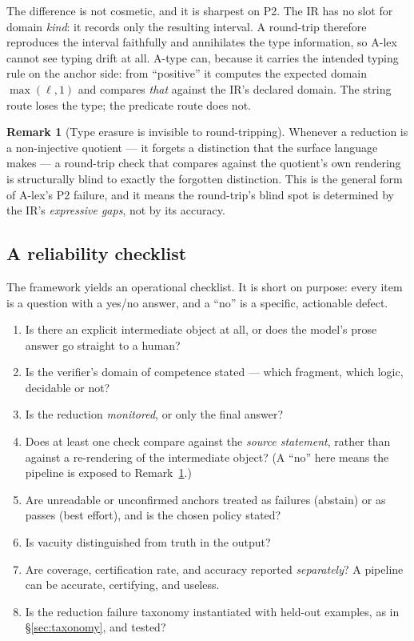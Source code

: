 \documentclass[11pt]{article}
\newcommand{\Alex}{\textsf{A-lex}}
\newcommand{\Atype}{\textsf{A-type}}
\theoremstyle{definition}
\newtheorem{remark}{Remark}
\begin{document}
The difference is not cosmetic, and it is sharpest on P2. The IR has no slot for
domain \emph{kind}: it records only the resulting interval. A round-trip
therefore reproduces the interval faithfully and annihilates the type
information, so \Alex{} cannot see typing drift at all. \Atype{} can, because it
carries the intended typing rule on the anchor side: from ``positive'' it
computes the expected domain $\max(\ell, 1)$ and compares \emph{that} against the
IR's declared domain. The string route loses the type; the predicate route does
not.

\begin{remark}[Type erasure is invisible to round-tripping]
\label{rem:erasure}
Whenever a reduction is a non-injective quotient --- it forgets a distinction that
the surface language makes --- a round-trip check that compares against the
quotient's own rendering is structurally blind to exactly the forgotten
distinction. This is the general form of \Alex's P2 failure, and it means the
round-trip's blind spot is determined by the IR's \emph{expressive gaps}, not by
its accuracy.
\end{remark}

\subsection{A reliability checklist}
\label{sec:checklist}

The framework yields an operational checklist. It is short on purpose: every item
is a question with a yes/no answer, and a ``no'' is a specific, actionable defect.

\begin{enumerate}
  \item[\textbf{C1}] Is there an explicit intermediate object at all, or does the
        model's prose answer go straight to a human?
  \item[\textbf{C2}] Is the verifier's domain of competence stated --- which
        fragment, which logic, decidable or not?
  \item[\textbf{C3}] Is the reduction \emph{monitored}, or only the final answer?
  \item[\textbf{C4}] Does at least one check compare against the \emph{source
        statement}, rather than against a re-rendering of the intermediate
        object? (A ``no'' here means the pipeline is exposed to
        Remark~\ref{rem:erasure}.)
  \item[\textbf{C5}] Are unreadable or unconfirmed anchors treated as failures
        (abstain) or as passes (best effort), and is the chosen policy stated?
  \item[\textbf{C6}] Is vacuity distinguished from truth in the output?
  \item[\textbf{C7}] Are coverage, certification rate, and accuracy reported
        \emph{separately}? A pipeline can be accurate, certifying, and useless.
  \item[\textbf{C8}] Is the reduction failure taxonomy instantiated with held-out
        examples, as in \S\ref{sec:taxonomy}, and tested?
\end{enumerate}
\end{document}

